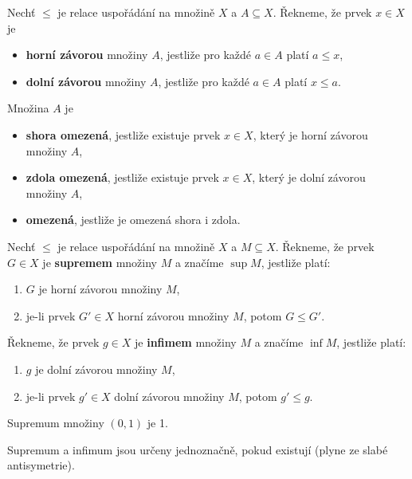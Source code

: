 \begin{definice}
Nechť $\le$ je relace uspořádání na množině $X$ a $A\subseteq X$. Řekneme, že prvek
$x\in X$ je
\begin{itemize}
\item \textbf{horní závorou} množiny $A$, jestliže pro každé $a\in A$ platí $a\le x$,
\item \textbf{dolní závorou} množiny $A$, jestliže pro každé $a\in A$ platí $x\le a$.
\end{itemize}
\par Množina $A$ je
\begin{itemize}
\item \textbf{shora omezená}, jestliže existuje prvek $x\in X$, který je horní závorou množiny $A$,
\item \textbf{zdola omezená}, jestliže existuje prvek $x\in X$, který je dolní závorou množiny $A$,
\item \textbf{omezená}, jestliže je omezená shora i zdola.
\end{itemize}
\end{definice}

\begin{definice}
Nechť $\le$ je relace uspořádání na množině $X$ a $M\subseteq X$. Řekneme, že prvek
$G\in X$ je \textbf{supremem} množiny $M$ a značíme $\sup M$, jestliže platí:
\begin{enumerate}
\item $G$ je horní závorou množiny $M$,
\item je-li prvek $G'\in X$ horní závorou množiny $M$, potom $G\le G'$.
\end{enumerate}

Řekneme, že prvek $g\in X$ je \textbf{infimem} množiny $M$ a značíme $\inf M$, jestliže platí:
\begin{enumerate}
\item $g$ je dolní závorou množiny $M$,
\item je-li prvek $g'\in X$ dolní závorou množiny $M$, potom $g'\le g$.
\end{enumerate}

\end{definice}

\begin{priklad}
	Supremum množiny $(0,1)$ je 1.
\end{priklad}

\begin{poznamka}
	Supremum a infimum jsou určeny jednoznačně, pokud existují (plyne ze slabé antisymetrie).
\end{poznamka}

